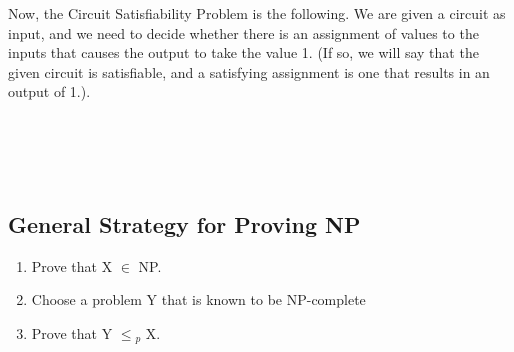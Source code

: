 \documentclass{article}
\begin{document}
Now, the Circuit Satisfiability Problem is the following. We are given a circuit as input, and we need to decide whether there is an assignment of values to the inputs that causes the output to take the value 1. (If so, we will say that the given circuit is satisfiable, and a satisfying assignment is one that results in an output of 1.).\\

\\

\\

\\

\\

\subsection{General Strategy for Proving NP}
\begin{enumerate}
    \item Prove that X $\in$ NP.
    \item Choose a problem Y that is known to be NP-complete
    \item Prove that Y $\le$$_p$ X.
\end{enumerate}
\end{document}
